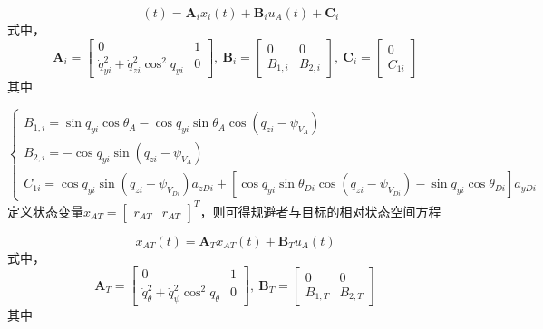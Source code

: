 \begin{equation}
\label{eq:12}
\mathop {{x_i}}\limits^. (t) = {{\mathbf{A}}_i}{x_i}(t) + {{\mathbf{B}}_i}{u_A}(t) + {{\mathbf{C}}_i}
\end{equation}
式中，
\[{{\mathbf{A}}_i} = \left[ {\begin{array}{*{20}{c}}
  0&1 \\ 
  {\dot q_{yi}^2 + \dot q_{zi}^2{{\cos }^2}{q_{yi}}}&0 
\end{array}} \right],\ {{\mathbf{B}}_i} = \left[ {\begin{array}{*{20}{c}}
  0&0 \\ 
  {{B_{1,i}}}&{{B_{2,i}}} 
\end{array}} \right],\ {{\mathbf{C}}_i} = \left[ {\begin{array}{*{20}{c}}
  0 \\ 
  {{C_{1i}}} 
\end{array}} \right]\]
其中

\begin{equation}
\label{eq:13}
\left\{ {\begin{array}{*{20}{l}}
  {{B_{1,i}} = \sin {q_{yi}}\cos {\theta _A} - \cos {q_{yi}}\sin {\theta _A}\cos \left( {{q_{zi}} - {\psi _{{V_A}}}} \right)} \\ 
  {{B_{2,i}} =  - \cos {q_{yi}}\sin \left( {{q_{zi}} - {\psi _{{V_A}}}} \right)} \\ 
  {{C_{1i}} = \cos {q_{yi}}\sin \left( {{q_{zi}} - {\psi _{{V_{Di}}}}} \right){a_{zDi}} + [\cos {q_{yi}}\sin {\theta _{Di}}\cos \left( {{q_{zi}} - {\psi _{{V_{Di}}}}} \right) - \sin {q_{yi}}\cos {\theta _{Di}}]{a_{yDi}}} 
\end{array}} \right.
\end{equation}
定义状态变量${x_{AT}} = {\left[ {\begin{array}{*{20}{c}}
  {{r_{AT}}}&{{{\dot r}_{AT}}} 
\end{array}} \right]^T}$，则可得规避者与目标的相对状态空间方程

\begin{equation}
\label{eq:14}
{\dot x_{AT}}(t) = {{\mathbf{A}}_T}{x_{AT}}(t) + {{\mathbf{B}}_T}{u_A}(t)
\end{equation}
式中，
\[{{\mathbf{A}}_T} = \left[ {\begin{array}{*{20}{c}}
  0&1 \\ 
  {\dot q_\theta ^2 + \dot q_\psi ^2{{\cos }^2}{q_\theta }}&0 
\end{array}} \right],\ {{\mathbf{B}}_T} = \left[ {\begin{array}{*{20}{c}}
  0&0 \\ 
  {{B_{1,T}}}&{{B_{2,T}}} 
\end{array}} \right]\]
其中


